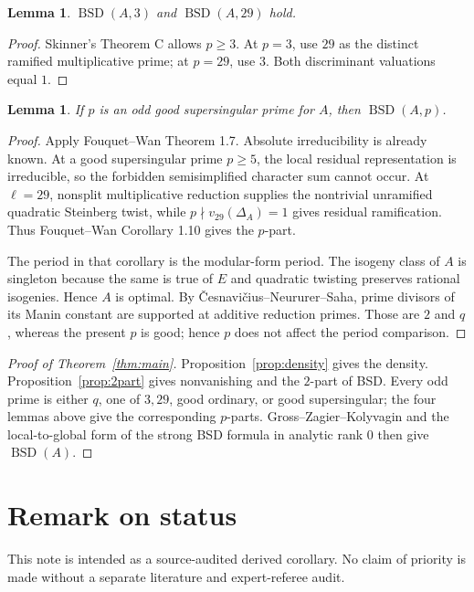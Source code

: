 \documentclass[11pt]{article}
\newtheorem{lemma}[theorem]{Lemma}
\newcommand{\BSD}{\operatorname{BSD}}
\begin{document}
\begin{lemma}\label{lem:mult}
\(\BSD(A,3)\) and \(\BSD(A,29)\) hold.
\end{lemma}

\begin{proof}
Skinner's Theorem C allows \(p\ge3\).  At \(p=3\), use \(29\) as the
distinct ramified multiplicative prime; at \(p=29\), use \(3\).
Both discriminant valuations equal \(1\).
\end{proof}

\begin{lemma}\label{lem:ss}
If \(p\) is an odd good supersingular prime for \(A\), then \(\BSD(A,p)\).
\end{lemma}

\begin{proof}
Apply Fouquet--Wan Theorem 1.7.  Absolute irreducibility is already known.
At a good supersingular prime \(p\ge5\), the local residual representation
is irreducible, so the forbidden semisimplified character sum cannot occur.
At \(\ell=29\), nonsplit multiplicative reduction supplies the nontrivial
unramified quadratic Steinberg twist, while
\(p\nmid v_{29}(\Delta_A)=1\) gives residual ramification.  Thus
Fouquet--Wan Corollary 1.10 gives the \(p\)-part.

The period in that corollary is the modular-form period.  The isogeny class
of \(A\) is singleton because the same is true of \(E\) and quadratic
twisting preserves rational isogenies.  Hence \(A\) is optimal.  By
Česnavičius--Neururer--Saha, prime divisors of its Manin constant are
supported at additive reduction primes.  Those are \(2\) and \(q\), whereas
the present \(p\) is good; hence \(p\) does not affect the period comparison.
\end{proof}

\begin{proof}[Proof of Theorem~\ref{thm:main}]
Proposition~\ref{prop:density} gives the density.  Proposition~\ref{prop:2part}
gives nonvanishing and the \(2\)-part of BSD.  Every odd prime is either
\(q\), one of \(3,29\), good ordinary, or good supersingular; the four lemmas
above give the corresponding \(p\)-parts.  Gross--Zagier--Kolyvagin and the
local-to-global form of the strong BSD formula in analytic rank \(0\) then
give \(\BSD(A)\).
\end{proof}

\section*{Remark on status}
This note is intended as a source-audited derived corollary.  No claim of
priority is made without a separate literature and expert-referee audit.
\end{document}

